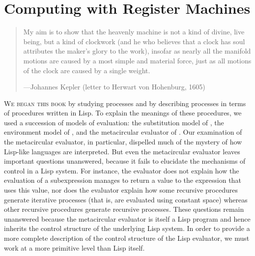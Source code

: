 \chapter{Computing with Register Machines}
\label{Chapter 5}


\begin{quote}
My aim is to show that the heavenly machine is not a kind of divine, live
being, but a kind of clockwork (and he who believes that a clock has soul
attributes the maker's glory to the work), insofar as nearly all the manifold
motions are caused by a most simple and material force, just as all motions of
the clock are caused by a single weight.

---Johannes Kepler (letter to Herwart von Hohenburg, 1605)
\end{quote}


\noindent
\lettrine[findent=1pt]{W}{e began this book} by studying processes and by describing processes in terms
of procedures written in Lisp.  To explain the meanings of these procedures, we
used a succession of models of evaluation: the substitution model of
, the environment model of , and the metacircular
evaluator of .  Our examination of the metacircular evaluator,
in particular, dispelled much of the mystery of how Lisp-like languages are
interpreted.  But even the metacircular evaluator leaves important questions
unanswered, because it fails to elucidate the mechanisms of control in a Lisp
system.  For instance, the evaluator does not explain how the evaluation of a
subexpression manages to return a value to the expression that uses this value,
nor does the evaluator explain how some recursive procedures generate iterative
processes (that is, are evaluated using constant space) whereas other recursive
procedures generate recursive processes.  These questions remain unanswered
because the metacircular evaluator is itself a Lisp program and hence inherits
the control structure of the underlying Lisp system.  In order to provide a
more complete description of the control structure of the Lisp evaluator, we
must work at a more primitive level than Lisp itself.

